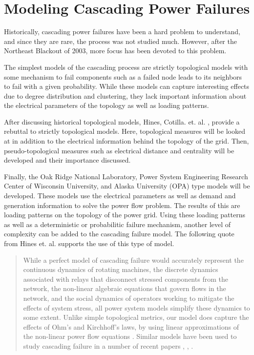 \section{Modeling Cascading Power Failures}

Historically, cascading power failures have been a hard problem to understand, and since they are rare, the process was not studied much.  However, after the Northeast Blackout of 2003, more focus has been devoted to this problem.  

The simplest models of the cascading process are strictly topological models with some mechanism to fail components such as a failed node leads to its neighbors to fail with a given probability.  While these models can capture interesting effects due to degree distribution and clustering, they lack important information about the electrical parameters of the topology as well as loading patterns.   

After discussing historical topological models, Hines, Cotilla. et. al. \cite{hines_2010}, \cite{cotilla_2012} provide a rebuttal to strictly topological models.  Here, topological measures will be looked at in addition to the electrical information behind the topology of the grid. Then, pseudo-topological measures such as electrical distance and centrality will be developed and their importance discussed.

Finally, the Oak Ridge National Laboratory, Power System Engineering Research Center of Wisconsin University, and Alaska University (OPA) type models will be developed.  These models use the electrical parameters as well as demand and generation information to solve the power flow problem.  The results of this are loading patterns on the topology of the power grid.  Using these loading patterns as well as a deterministic or probabilitic failure mechanism, another level of complexity can be added to the cascading failure model.  The following quote from Hines et. al. \cite{hines_2011} supports the use of this type of model.

\begin{quote}
While a perfect model of cascading failure would accurately represent the continuous dynamics of rotating machines, the discrete dynamics associated with relays that disconnect stressed components from the network, the non-linear algebraic equations that govern flows in the network, and the social dynamics of operators working to mitigate the effects of system stress, all power system models simplify these dynamics to some extent. Unlike simple topological metrics, our model does capture the effects of Ohm's and Kirchhoff's laws, by using linear approximations of the non-linear power flow equations \cite{bergen_1986}. Similar models have been used to study cascading failure in a number of recent papers \cite{carreras_2004}, \cite{dobson_2007}, \cite{mei_2009}.
\end{quote}

